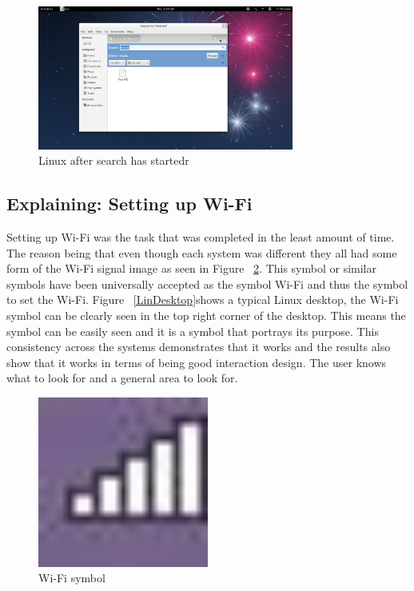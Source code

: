 \documentclass[11pt]{article}
\begin{document}
\begin{figure}[h!]
  \centering
    \includegraphics[width=0.75\textwidth]{./Images/Linux_Search_After}
  \caption{Linux after search has startedr}
 \label{SearchLinAfter}
\end{figure}

\subsection{Explaining: Setting up Wi-Fi}
Setting up Wi-Fi was the task that was completed in the least amount of time. The reason being that even though each system was different they all had some form of the Wi-Fi signal image as seen in Figure 	~\ref{WF}. This symbol or similar symbols have been universally accepted as the symbol Wi-Fi and thus the symbol to set the Wi-Fi. Figure ~\ref{LinDesktop}shows a typical Linux desktop, the Wi-Fi symbol can be clearly seen in the top right corner of the desktop. This means the symbol can be easily seen and it is a symbol that portrays its purpose. This consistency across the systems demonstrates that it works and the results also show that it works in terms of being good interaction design. The user knows what to look for and a general area to look for.

\begin{figure}[h!]
  \centering
    \includegraphics[width=0.5\textwidth]{./Images/Symbol_Wi-Fi}
  \caption{Wi-Fi symbol}
 \label{WF}
\end{figure}
\end{document}
